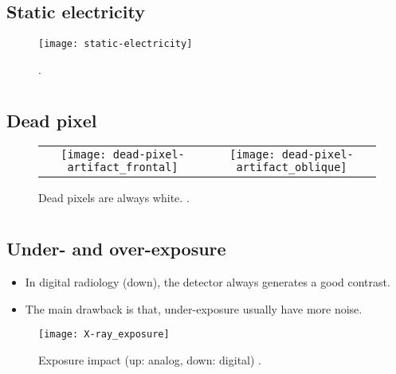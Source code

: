 \subsection{Static electricity}
\vspace{-1ex}
\begin{figure}[!h]
  \centering
  \texttt{[image: static-electricity]}
  \caption{\cite{radiopaedia}.\label{fig:static_electricity}}
\end{figure}

\section*{}
\subsection{Dead pixel}
\vspace{-1ex}
\begin{figure}[!h]
  \centering
  \begin{tabular}{cc}
    \texttt{[image: dead-pixel-artifact\_frontal]} &
                                                               \texttt{[image: dead-pixel-artifact\_oblique]}
  \end{tabular}                                                
  \caption{Dead pixels are always white. \cite{radiopaedia}.\label{fig:dead_pixel}}
\end{figure}

\section*{}
\subsection{Under- and over-exposure}
\begin{itemize}
\item In digital radiology (down), the detector always generates a good contrast.
\item The main drawback is that, under-exposure usually have more noise.
\end{itemize}
\vspace{-1ex}
\begin{figure}[!h]
  \centering
    \texttt{[image: X-ray\_exposure]}
    \caption{Exposure impact (up: analog, down: digital)
      \cite{VELDKAMP2009209}.\label{fig:exposure}}
\end{figure}

